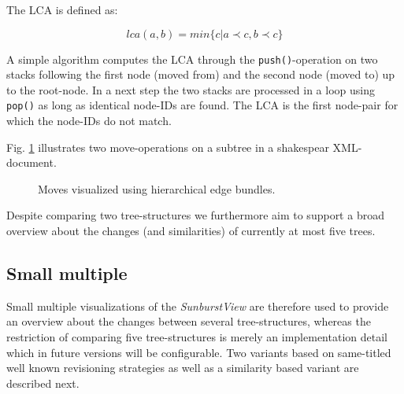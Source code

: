The LCA is defined as:

\begin{equation}
lca(a{,} b) = min\{c|a \prec c, b \prec c\}
\end{equation}

A simple algorithm computes the LCA through the \texttt{push()}-operation on two stacks following the first node (moved from) and the second node (moved to) up to the root-node. In a next step the two stacks are processed in a loop using \texttt{pop()} as long as identical node-IDs are found. The LCA is the first node-pair for which the node-IDs do not match.

Fig. \ref{fig:moves} illustrates two move-operations on a subtree in a shakespear XML-document.

\begin{figure}[tb]
\caption{\label{fig:moves} Moves visualized using hierarchical edge bundles.}
\end{figure}

Despite comparing two tree-structures we furthermore aim to support a broad overview about the changes (and similarities) of currently at most five trees.

\subsection{Small multiple}\label{subsec::smallmultiple}
Small multiple visualizations of the \emph{SunburstView} are therefore used to provide an overview about the changes between several tree-structures, whereas the restriction of comparing five tree-structures is merely an implementation detail which in future versions will be configurable. Two variants based on same-titled well known revisioning strategies as well as a similarity based variant are described next.

